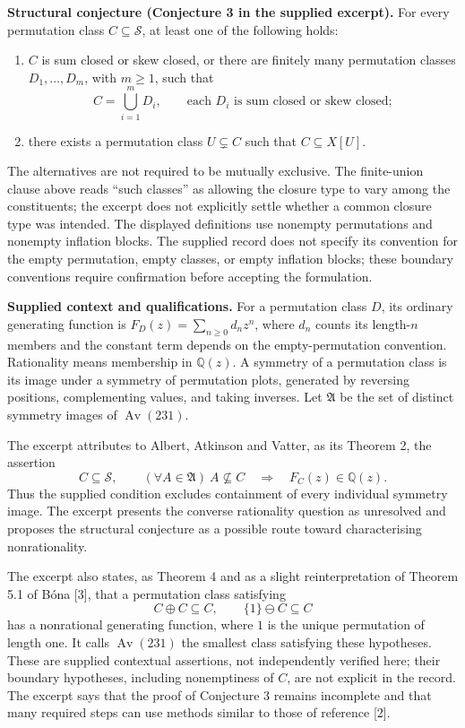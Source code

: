 \documentclass[11pt]{article}
\newcommand{\Q}{\mathbb{Q}}
\begin{document}
\textbf{Structural conjecture (Conjecture 3 in the supplied excerpt).} For every permutation class \(C\subseteq\mathcal S\), at least one of the following holds:
\begin{enumerate}
\item \(C\) is sum closed or skew closed, or there are finitely many permutation classes \(D_1,\ldots,D_m\), with \(m\geq1\), such that
\[
C=\bigcup_{i=1}^{m}D_i,
\qquad
\text{each }D_i\text{ is sum closed or skew closed};
\]
\item there exists a permutation class \(U\subsetneq C\) such that \(C\subseteq X[U]\).
\end{enumerate}
The alternatives are not required to be mutually exclusive. The finite-union clause above reads ``such classes'' as allowing the closure type to vary among the constituents; the excerpt does not explicitly settle whether a common closure type was intended. The displayed definitions use nonempty permutations and nonempty inflation blocks. The supplied record does not specify its convention for the empty permutation, empty classes, or empty inflation blocks; these boundary conventions require confirmation before accepting the formulation.

\textbf{Supplied context and qualifications.} For a permutation class \(D\), its ordinary generating function is \(F_D(z)=\sum_{n\geq0}d_nz^n\), where \(d_n\) counts its length-\(n\) members and the constant term depends on the empty-permutation convention. Rationality means membership in \(\Q(z)\). A symmetry of a permutation class is its image under a symmetry of permutation plots, generated by reversing positions, complementing values, and taking inverses. Let \(\mathfrak A\) be the set of distinct symmetry images of \(\operatorname{Av}(231)\).

The excerpt attributes to Albert, Atkinson and Vatter, as its Theorem 2, the assertion
\[
C\subseteq\mathcal S,\qquad
(\forall A\in\mathfrak A)\ A\nsubseteq C
\quad\Longrightarrow\quad F_C(z)\in\Q(z).
\]
Thus the supplied condition excludes containment of every individual symmetry image. The excerpt presents the converse rationality question as unresolved and proposes the structural conjecture as a possible route toward characterising nonrationality.

The excerpt also states, as Theorem 4 and as a slight reinterpretation of Theorem 5.1 of B\'ona [3], that a permutation class satisfying
\[
C\oplus C\subseteq C,
\qquad
\{1\}\ominus C\subseteq C
\]
has a nonrational generating function, where \(1\) is the unique permutation of length one. It calls \(\operatorname{Av}(231)\) the smallest class satisfying these hypotheses. These are supplied contextual assertions, not independently verified here; their boundary hypotheses, including nonemptiness of \(C\), are not explicit in the record. The excerpt says that the proof of Conjecture 3 remains incomplete and that many required steps can use methods similar to those of reference [2].
\end{document}
